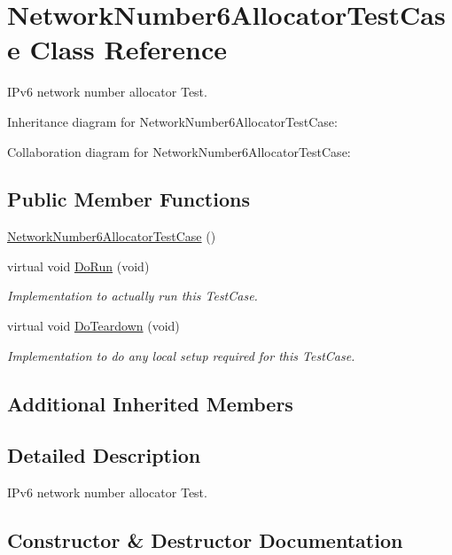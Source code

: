 \hypertarget{classNetworkNumber6AllocatorTestCase}{}\section{Network\+Number6\+Allocator\+Test\+Case Class Reference}
\label{classNetworkNumber6AllocatorTestCase}


I\+Pv6 network number allocator Test.  




Inheritance diagram for Network\+Number6\+Allocator\+Test\+Case\+:


Collaboration diagram for Network\+Number6\+Allocator\+Test\+Case\+:
\subsection*{Public Member Functions}
\begin{DoxyCompactItemize}
\item 
\hyperlink{classNetworkNumber6AllocatorTestCase_a4174f98e3013d9ac9759e232217d891e}{Network\+Number6\+Allocator\+Test\+Case} ()
\item 
virtual void \hyperlink{classNetworkNumber6AllocatorTestCase_a96cb65cc60b0dd70d07d6eafc8715bdf}{Do\+Run} (void)
\begin{DoxyCompactList}\small\item\em Implementation to actually run this Test\+Case. \end{DoxyCompactList}\item 
virtual void \hyperlink{classNetworkNumber6AllocatorTestCase_a848d1104abd604a9a247291215423b5a}{Do\+Teardown} (void)
\begin{DoxyCompactList}\small\item\em Implementation to do any local setup required for this Test\+Case. \end{DoxyCompactList}\end{DoxyCompactItemize}
\subsection*{Additional Inherited Members}


\subsection{Detailed Description}
I\+Pv6 network number allocator Test. 

\subsection{Constructor \& Destructor Documentation}
